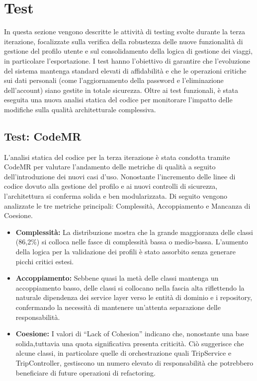 \section{Test}
In questa sezione vengono descritte le attività di testing svolte durante la terza iterazione, focalizzate sulla verifica della robustezza delle nuove funzionalità di gestione del profilo utente e sul consolidamento della logica di gestione dei viaggi, in particolare l'esportazione. I test hanno l'obiettivo di garantire che l'evoluzione del sistema mantenga standard elevati di affidabilità e che le operazioni critiche sui dati personali (come l'aggiornamento della password e l'eliminazione dell'account) siano gestite in totale sicurezza. Oltre ai test funzionali, è stata eseguita una nuova analisi statica del codice per monitorare l'impatto delle modifiche sulla qualità architetturale complessiva.

\subsection{Test: CodeMR}
L'analisi statica del codice per la terza iterazione è stata condotta tramite CodeMR per valutare l'andamento delle metriche di qualità a seguito dell'introduzione dei nuovi casi d'uso. Nonostante l'incremento delle linee di codice dovuto alla gestione del profilo e ai nuovi controlli di sicurezza, l'architettura si conferma solida e ben modularizzata.
Di seguito vengono analizzate le tre metriche principali: Complessità, Accoppiamento e Mancanza di Coesione.

\begin{itemize}
    \item \textbf{Complessità:} La distribuzione mostra che la grande maggioranza delle classi (86,2\%) si colloca nelle fasce di complessità bassa o medio-bassa. L'aumento della logica per la validazione dei profili è stato assorbito senza generare picchi critici estesi.
    \item \textbf{Accoppiamento:} Sebbene quasi la metà delle classi mantenga un accoppiamento basso, delle classi si collocano nella fascia alta riflettendo la naturale dipendenza dei service layer verso le entità di dominio e i repository, confermando la necessità di mantenere un'attenta separazione delle responsabilità.
    \item \textbf{Coesione:} I valori di ``Lack of Cohesion'' indicano che, nonostante una base solida,tuttavia una quota significativa presenta criticità. Ciò suggerisce che alcune classi, in particolare quelle di orchestrazione quali TripService e TripController, gestiscono un numero elevato di responsabilità che potrebbero beneficiare di future operazioni di refactoring.
\end{itemize}

